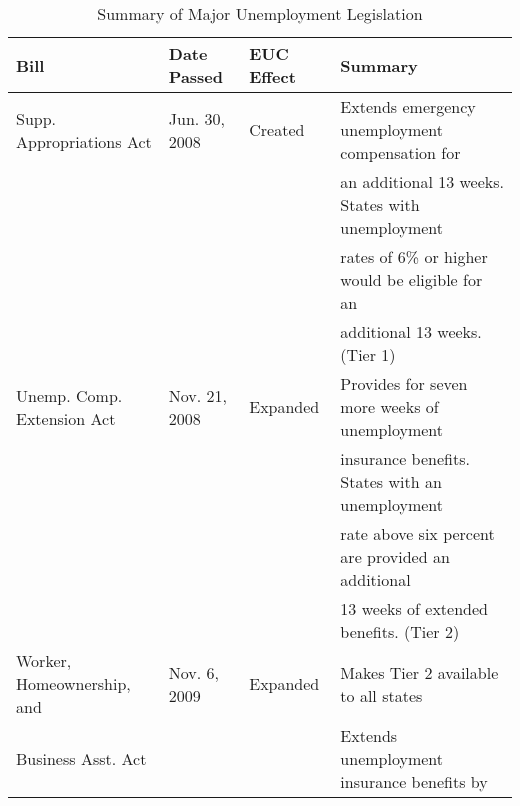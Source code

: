 \documentclass[12pt]{article}
\begin{document}
\begin{spacing}{2}
\clearpage





\begin{sidewaystable}
\centering
\begin{threeparttable}
\caption{Summary of Major Unemployment Legislation}
\label{tab:announcements}
\begin{tabular}{llll}
\hline
 Bill  & Date Passed  & EUC Effect  &  Summary  \\
\hline
Supp. Appropriations Act & Jun. 30, 2008 & Created & Extends emergency unemployment compensation for\\
  &&&                                                      an additional 13 weeks. States with unemployment\\
 &&&                                                       rates of 6\% or higher would be eligible for an\\
  &&&                                                      additional 13 weeks. (Tier 1) \\
Unemp. Comp. Extension Act & Nov. 21, 2008& Expanded& Provides for seven more weeks of unemployment \\
  &&&                                                      insurance benefits. States with an unemployment\\
  &&&                                                      rate above six percent are provided an additional\\
    &&&                                                    13 weeks of extended benefits. (Tier 2)\\
Worker, Homeownership, and & Nov. 6, 2009 &Expanded & Makes Tier 2 available to all states\\
  Business Asst. Act     &&&                                       Extends unemployment insurance benefits by\\

\end{tabular}
\end{threeparttable}
\end{sidewaystable}
\end{spacing}
\end{document}

